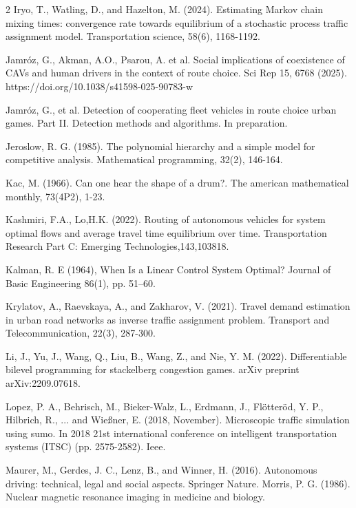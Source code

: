 \documentclass[a4paper,11pt]{article}
\begin{document}
\begin{thebibliography}{2}
 Iryo, T., Watling, D., and Hazelton, M. (2024). Estimating Markov chain mixing times: convergence rate towards equilibrium of a stochastic process traffic assignment model. Transportation science, 58(6), 1168-1192.

 Jamróz, G., Akman, A.O., Psarou, A. et al. Social implications of coexistence of CAVs and human drivers in the context of route choice. Sci Rep 15, 6768 (2025). https://doi.org/10.1038/s41598-025-90783-w

 Jamróz, G., et al. 
Detection of cooperating fleet vehicles in route choice urban games. Part II. Detection methods and algorithms. In preparation.

 Jeroslow, R. G. (1985). The polynomial hierarchy and a simple model for competitive analysis. Mathematical programming, 32(2), 146-164.

 Kac, M. (1966). Can one hear the shape of a drum?. The american mathematical monthly, 73(4P2), 1-23.

  Kashmiri, F.A., Lo,H.K. (2022). Routing of autonomous vehicles for system optimal flows and average travel time equilibrium over time. Transportation Research Part C: Emerging Technologies,143,103818.

  Kalman, R. E (1964), When Is a Linear Control System Optimal? Journal of Basic
Engineering 86(1), pp. 51–60.

 Krylatov, A., Raevskaya, A., and Zakharov, V. (2021). Travel demand estimation in urban road networks as inverse traffic assignment problem. Transport and Telecommunication, 22(3), 287-300.


 Li, J., Yu, J., Wang, Q., Liu, B., Wang, Z., and Nie, Y. M. (2022). Differentiable bilevel programming for stackelberg congestion games. arXiv preprint arXiv:2209.07618.

 Lopez, P. A., Behrisch, M., Bieker-Walz, L., Erdmann, J., Fl\"otter\"od, Y. P., Hilbrich, R., ... and Wießner, E. (2018, November). Microscopic traffic simulation using sumo. In 2018 21st international conference on intelligent transportation systems (ITSC) (pp. 2575-2582). Ieee.

 Maurer, M., Gerdes, J. C., Lenz, B., and Winner, H. (2016). Autonomous driving: technical, legal and social aspects. Springer Nature.
 Morris, P. G. (1986). Nuclear magnetic resonance imaging in medicine and biology.


\end{thebibliography}
\end{document}
